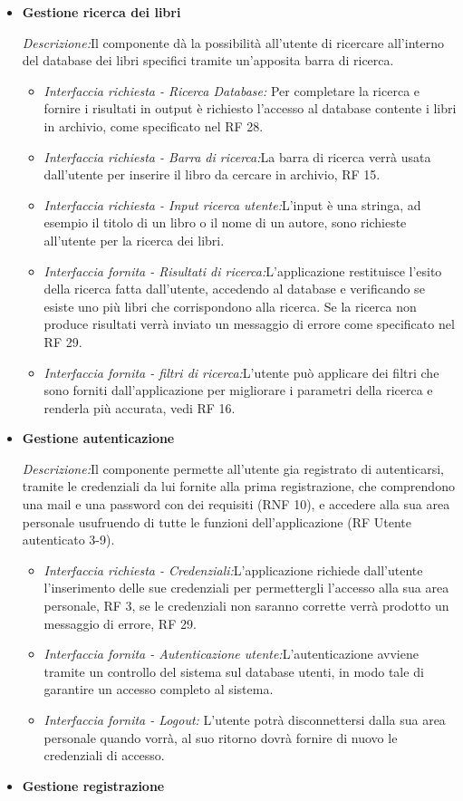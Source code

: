 \documentclass{article}
\begin{document}
\begin{itemize}
    \item \textbf{Gestione ricerca dei libri}
    
    \textit{Descrizione:}Il componente dà la possibilità all’utente di ricercare all’interno del database dei libri specifici tramite un’apposita barra di ricerca.
    \begin{itemize}
        \item \textit{Interfaccia richiesta - Ricerca Database:} Per completare la ricerca e fornire i risultati in output è richiesto l’accesso al database contente i libri in archivio, come specificato nel RF 28.
        \item \textit{Interfaccia richiesta - Barra di ricerca:}La barra di ricerca verrà usata dall’utente per inserire il  libro da cercare in archivio, RF 15.
        \item \textit{Interfaccia richiesta - Input ricerca utente:}L’input è una stringa, ad esempio il titolo di un libro o il nome di un autore, sono richieste all’utente per la ricerca dei libri.
        \item \textit{Interfaccia fornita - Risultati di ricerca:}L’applicazione restituisce l’esito della ricerca fatta dall’utente, accedendo al database e verificando se esiste uno più libri che corrispondono alla ricerca. Se la ricerca non produce risultati verrà inviato un messaggio di errore come specificato nel RF 29.
        \item \textit{Interfaccia fornita - filtri di ricerca:}L’utente può applicare dei filtri che sono forniti dall’applicazione per migliorare i parametri della ricerca e renderla più accurata, vedi RF 16.
         \end{itemize}
    \item \textbf{Gestione autenticazione}
    
    \textit{Descrizione:}Il componente permette all’utente gia registrato di autenticarsi, tramite le credenziali da lui fornite alla prima registrazione, che comprendono una mail e una password con dei requisiti (RNF 10), e accedere alla sua area personale usufruendo di tutte le funzioni dell’applicazione (RF Utente autenticato 3-9). \\
    \begin{itemize}
        \item \textit{Interfaccia richiesta - Credenziali:}L’applicazione richiede dall’utente l’inserimento delle sue credenziali per permettergli l’accesso alla sua area personale, RF 3, se le credenziali non saranno corrette verrà prodotto un messaggio di errore, RF 29.
        \item \textit{Interfaccia fornita - Autenticazione utente:}L’autenticazione avviene tramite un controllo del sistema sul database utenti, in modo tale di garantire un accesso completo al sistema.
        \item \textit{Interfaccia fornita - Logout:} L’utente potrà disconnettersi dalla sua area personale quando vorrà, al suo ritorno dovrà fornire di nuovo le credenziali di accesso.
    \end{itemize}
    \item \textbf{Gestione registrazione}
    

\end{itemize}
\end{document}
